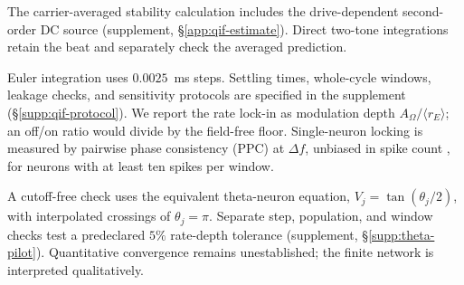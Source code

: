 The carrier-averaged stability calculation includes the drive-dependent
second-order DC source (supplement, \S\ref{app:qif-estimate}). Direct two-tone
integrations retain the beat and separately check the averaged prediction.

Euler integration uses $0.0025$~ms steps. Settling times, whole-cycle windows,
leakage checks, and sensitivity protocols are specified in the supplement
(\S\ref{supp:qif-protocol}).
We report the rate lock-in as modulation depth
$A_\Omega/\langle r_E\rangle$; an off/on ratio would divide by the
field-free floor. Single-neuron locking is measured by pairwise phase
consistency (PPC) at $\Delta f$, unbiased in spike count
\cite{vinck2010}, for neurons with at least ten spikes per window.

A cutoff-free check uses the equivalent theta-neuron equation,
$V_j=\tan(\theta_j/2)$, with interpolated crossings of $\theta_j=\pi$.
Separate step, population, and window checks test a predeclared $5\%$
rate-depth tolerance (supplement, \S\ref{supp:theta-pilot}). Quantitative
convergence remains unestablished; the finite network is interpreted qualitatively.
\ifjne\else

\fi

\ifjne\else

\fi

